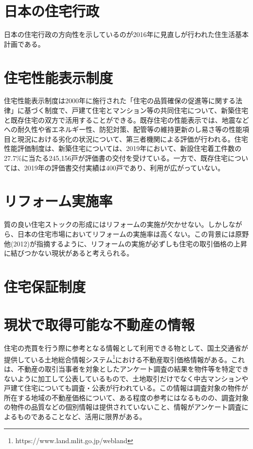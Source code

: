 \documentclass[a4paper,fontsize=11pt,report,notitlepage,line_length=38zw,number_of_lines=40]{jlreq}
\begin{document}
\section{日本の住宅行政}
日本の住宅行政の方向性を示しているのが2016年に見直しが行われた住生活基本計画である。

\section{住宅性能表示制度}
住宅性能表示制度は2000年に施行された「住宅の品質確保の促進等に関する法律」に基づく制度で、戸建て住宅とマンション等の共同住宅について、新築住宅と既存住宅の双方で活用することができる。既存住宅の性能表示では、地震などへの耐久性や省エネルギー性、防犯対策、配管等の維持更新のし易さ等の性能項目と現況における劣化の状況について、第三者機関による評価が行われる。住宅性能評価制度は、新築住宅については、2019年において、新設住宅着工件数の27.7\%に当たる245,156戸が評価書の交付を受けている。一方で、既存住宅については、2019年の評価書交付実績は400戸であり、利用が広がっていない。


\section{リフォーム実施率}
質の良い住宅ストックの形成にはリフォームの実施が欠かせない。しかしながら、日本の住宅市場においてリフォームの実施率は高くない。この背景には原野他(2012)が指摘するように、リフォームの実施が必ずしも住宅の取引価格の上昇に結びつかない現状があると考えられる。

\section{住宅保証制度}

\section{現状で取得可能な不動産の情報}
住宅の売買を行う際に参考となる情報として利用できる物として、国土交通省が提供している土地総合情報システム\footnote{https://www.land.mlit.go.jp/webland}における不動産取引価格情報がある。これは、不動産の取引当事者を対象としたアンケート調査の結果を物件等を特定できないように加工して公表しているもので、土地取引だけでなく中古マンションや戸建て住宅についても調査・公表が行われている。この情報は調査対象の物件が所在する地域の不動産価格について、ある程度の参考にはなるものの、調査対象の物件の品質などの個別情報は提供されていないこと、情報がアンケート調査によるものであることなど、活用に限界がある。
\end{document}
